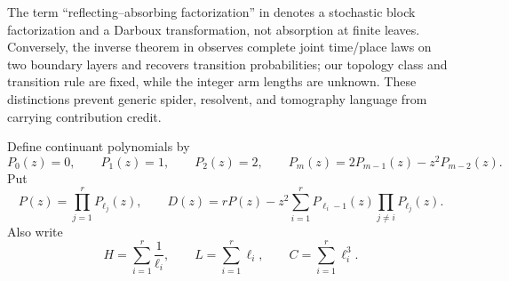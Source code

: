 \documentclass[a4paper,10pt]{amsart}
\theoremstyle{remark}
\begin{document}
The term ``reflecting--absorbing factorization'' in
\cite{DelaIglesiaJuarez2023} denotes a stochastic block factorization and a
Darboux transformation, not absorption at finite leaves.  Conversely, the
inverse theorem in \cite{DelaPenaGzylMcDonald2008} observes complete joint
time/place laws on two boundary layers and recovers transition probabilities;
our topology class and transition rule are fixed, while the integer arm
lengths are unknown.  These distinctions prevent generic spider, resolvent,
and tomography language from carrying contribution credit.

Define continuant polynomials by
\begin{equation}\label{eq:P-rec}
 P_0(z)=0,\qquad P_1(z)=1,\qquad P_2(z)=2,
 \qquad P_m(z)=2P_{m-1}(z)-z^2P_{m-2}(z).
\end{equation}
Put
\begin{equation}\label{eq:D-def}
 P(z)=\prod_{j=1}^rP_{\ell_j}(z),\qquad
 D(z)=rP(z)-z^2\sum_{i=1}^rP_{\ell_i-1}(z)
                 \prod_{j\ne i}P_{\ell_j}(z).
\end{equation}
Also write
\begin{equation}\label{eq:HLC}
 H=\sum_{i=1}^r\frac1{\ell_i},\qquad
 L=\sum_{i=1}^r\ell_i,\qquad C=\sum_{i=1}^r\ell_i^3.
\end{equation}
\end{document}

